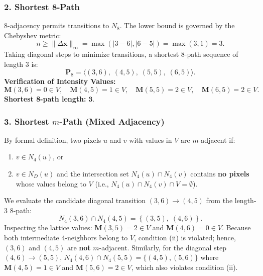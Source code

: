 \documentclass[11pt,a4paper]{article}
\begin{document}
\subsubsection{2. Shortest 8-Path}
8-adjacency permits transitions to $N_8$. The lower bound is governed by the Chebyshev metric:
\begin{equation}
n \ge \|\Delta \mathbf{x}\|_\infty = \max(|3 - 6|, |6 - 5|) = \max(3, 1) = 3.
\end{equation}
Taking diagonal steps to minimize transitions, a shortest 8-path sequence of length 3 is:
\begin{equation}
\mathbf{P}_8 = \langle (3, 6), \; (4, 5), \; (5, 5), \; (6, 5) \rangle.
\end{equation}
\noindent\textbf{Verification of Intensity Values:}
\begin{equation}
\mathbf{M}(3, 6) = 0 \in V, \quad \mathbf{M}(4, 5) = 1 \in V, \quad \mathbf{M}(5, 5) = 2 \in V, \quad \mathbf{M}(6, 5) = 2 \in V.
\end{equation}
\noindent\textbf{Shortest 8-path length:} $\mathbf{3}$.

\subsubsection{3. Shortest $m$-Path (Mixed Adjacency)}
By formal definition, two pixels $u$ and $v$ with values in $V$ are $m$-adjacent if:
\begin{enumerate}
    \item[(i)] $v \in N_4(u)$, or
    \item[(ii)] $v \in N_D(u)$ and the intersection set $N_4(u) \cap N_4(v)$ contains \textbf{no pixels} whose values belong to $V$ (i.e., $N_4(u) \cap N_4(v) \cap V = \emptyset$).
\end{enumerate}
We evaluate the candidate diagonal transition $(3, 6) \to (4, 5)$ from the length-3 8-path:
\begin{equation}
N_4(3, 6) \cap N_4(4, 5) = \left\{ (3, 5), \; (4, 6) \right\}.
\end{equation}
Inspecting the lattice values: $\mathbf{M}(3, 5) = 2 \in V$ and $\mathbf{M}(4, 6) = 0 \in V$. Because both intermediate 4-neighbors belong to $V$, condition (ii) is violated; hence, $(3, 6)$ and $(4, 5)$ are \textbf{not} $m$-adjacent. Similarly, for the diagonal step $(4, 6) \to (5, 5)$, $N_4(4, 6) \cap N_4(5, 5) = \{(4, 5), (5, 6)\}$ where $\mathbf{M}(4, 5)=1 \in V$ and $\mathbf{M}(5, 6)=2 \in V$, which also violates condition (ii).
\end{document}
